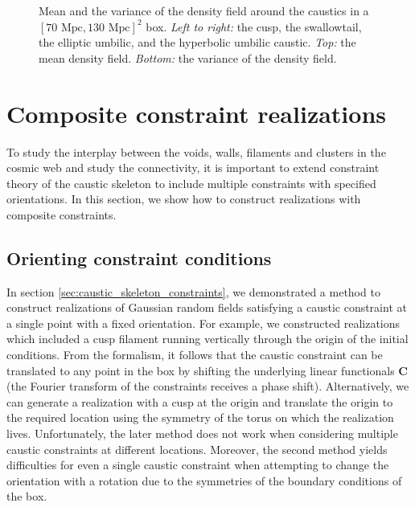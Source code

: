 \documentclass[a4paper, 11pt]{article}
\begin{document}
\begin{figure}
\begin{subfigure}[b]{0.24\textwidth}
\end{subfigure}
\caption{Mean and the variance of the density field around the caustics in a $[70\text{ Mpc},130 \text{ Mpc}]^2$ box. \textit{Left to right:} the cusp, the swallowtail, the elliptic umbilic, and the hyperbolic umbilic caustic. \textit{Top:} the mean density field. \textit{Bottom:} the variance of the density field.}\label{fig:mean_var_dens}
\end{figure}

\section{Composite constraint realizations}
To study the interplay between the voids, walls, filaments and clusters in the cosmic web and study the connectivity, it is important to extend constraint theory of the caustic skeleton to include multiple constraints with specified orientations. In this section, we show how to construct realizations with composite constraints.

\subsection{Orienting constraint conditions}\label{sec:orientation}
In section \ref{sec:caustic_skeleton_constraints}, we demonstrated a method to construct realizations of Gaussian random fields satisfying a caustic constraint at a single point with a fixed orientation. For example, we constructed realizations which included a cusp filament running vertically through the origin of the initial conditions. From the formalism, it follows that the caustic constraint can be translated to any point in the box by shifting the underlying linear functionals $\bm{C}$ (the Fourier transform of the constraints receives a phase shift). Alternatively, we can generate a realization with a cusp at the origin and translate the origin to the required location using the symmetry of the torus on which the realization lives. Unfortunately, the later method does not work when considering multiple caustic constraints at different locations. Moreover, the second method yields difficulties for even a single caustic constraint when attempting to change the orientation with a rotation due to the symmetries of the boundary conditions of the box.
\end{document}
